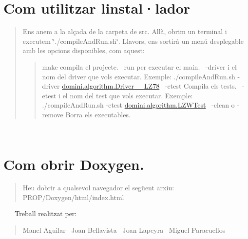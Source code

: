 \section*{Com utilitzar l\textquotesingle{}instal·lador}

\begin{quote}
Ens anem a la alçada de la carpeta de src. Allà, obrim un terminal i executem \char`\"{}./compile\+And\+Run.\+sh\char`\"{}. Llavors, ens sortirà un menú desplegable amb les opcions disponibles, com aquest\+: \begin{quote}
make compila el projecte.~\newline
 run per executar el main.~\newline
 -\/driver i el nom del driver que vols executar. Exemple\+: ./compile\+And\+Run.sh -\/driver \hyperlink{classdomini_1_1algorithm_1_1Driver____LZ78}{domini.\+algorithm.\+Driver\+\_\+\+\_\+\+L\+Z78}~\newline
 -\/ctest Compila els tests.~\newline
 -\/etest i el nom del test que vols executar. Exemple\+: ./compile\+And\+Run.sh -\/etest \hyperlink{classdomini_1_1algorithm_1_1LZWTest}{domini.\+algorithm.\+L\+Z\+W\+Test}~\newline
 -\/clean o -\/remove Borra els executables. \end{quote}
\end{quote}
~\newline


\section*{Com obrir Doxygen.}

\begin{quote}
Heu d\textquotesingle{}obrir a qualsevol navegador el següent arxiu\+: P\+R\+O\+P/\+Doxygen/html/index.\+html \end{quote}


~\newline
 ~\newline
 Treball realitzat per\+:~\newline
 \begin{quote}
Manel Aguilar~\newline
 Joan Bellavista~\newline
 Joan Lapeyra~\newline
 Miguel Paracuellos~\newline
\end{quote}

